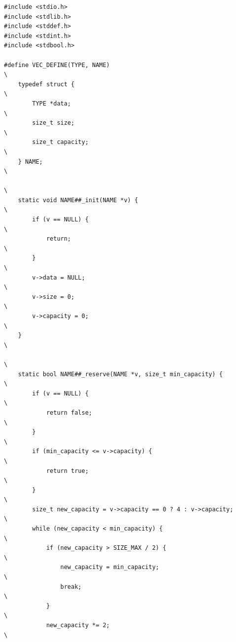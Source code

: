 \documentclass[11pt]{article}
\begin{document}
\begin{verbatim}
#include <stdio.h>
#include <stdlib.h>
#include <stddef.h>
#include <stdint.h>
#include <stdbool.h>

#define VEC_DEFINE(TYPE, NAME)                                                \
    typedef struct {                                                          \
        TYPE *data;                                                           \
        size_t size;                                                          \
        size_t capacity;                                                      \
    } NAME;                                                                   \
                                                                              \
    static void NAME##_init(NAME *v) {                                         \
        if (v == NULL) {                                                       \
            return;                                                           \
        }                                                                     \
        v->data = NULL;                                                       \
        v->size = 0;                                                          \
        v->capacity = 0;                                                      \
    }                                                                         \
                                                                              \
    static bool NAME##_reserve(NAME *v, size_t min_capacity) {                 \
        if (v == NULL) {                                                       \
            return false;                                                     \
        }                                                                     \
        if (min_capacity <= v->capacity) {                                     \
            return true;                                                      \
        }                                                                     \
        size_t new_capacity = v->capacity == 0 ? 4 : v->capacity;             \
        while (new_capacity < min_capacity) {                                  \
            if (new_capacity > SIZE_MAX / 2) {                                 \
                new_capacity = min_capacity;                                   \
                break;                                                        \
            }                                                                 \
            new_capacity *= 2;                                                \

\end{verbatim}
\end{document}
